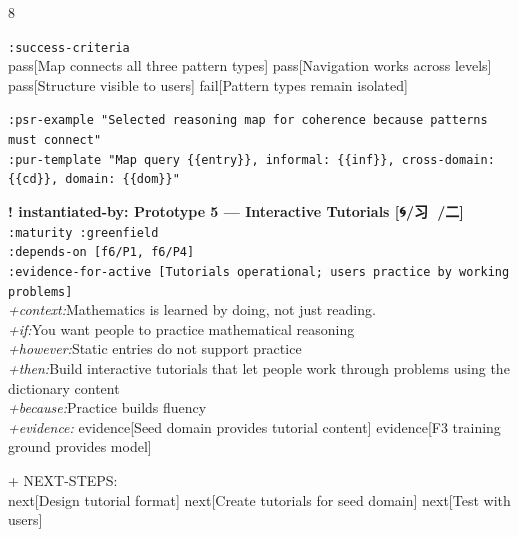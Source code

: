 \documentclass[landscape]{article}
\newcommand{\flexitag}[1]{\textcolor[gray]{0.35}{\textit{#1}}}
\newenvironment{devmapgreenfield}{%
  \def\FrameCommand{\colorbox{devmapgreenfieldbg}}%
  \setlength{\fboxsep}{2pt}%
  \MakeFramed{\advance\hsize-\width \FrameRestore}%
}{\endMakeFramed}
\begin{document}
\begin{paracol}{8}
\begin{devmapgreenfield}
\par
  \texttt{:\allowbreak{}success-\allowbreak{}criteria}\\
    pass[Map connects all three pattern types] pass[Navigation works across levels] pass[Structure visible to users] fail[Pattern types remain isolated]\\
\par
  \texttt{:\allowbreak{}psr-\allowbreak{}example "Selected reasoning map for coherence because patterns must connect"}\\
  \texttt{:\allowbreak{}pur-\allowbreak{}template "Map query \{\{entry\}\},\allowbreak{} informal:\allowbreak{} \{\{inf\}\},\allowbreak{} cross-\allowbreak{}domain:\allowbreak{} \{\{cd\}\},\allowbreak{} domain:\allowbreak{} \{\{dom\}\}"}\\
\par
\par
\end{devmapgreenfield}
\begin{devmapgreenfield}
\textbf{! instantiated-by: Prototype 5 — Interactive Tutorials [🌀/习 🐴/二]}\\
  \texttt{:\allowbreak{}maturity :\allowbreak{}greenfield}\\
  \texttt{:\allowbreak{}depends-\allowbreak{}on [f6/\allowbreak{}P1,\allowbreak{} f6/\allowbreak{}P4]}\\
  \texttt{:\allowbreak{}evidence-\allowbreak{}for-\allowbreak{}active [Tutorials operational;\allowbreak{} users practice by working problems]}\\
  \flexitag{+context:}Mathematics is learned by doing, not just reading.\\
  \flexitag{+if:}You want people to practice mathematical reasoning\\
  \flexitag{+however:}Static entries do not support practice\\
  \flexitag{+then:}Build interactive tutorials that let people work through problems using the dictionary content\\
  \flexitag{+because:}Practice builds fluency\\
  \flexitag{+evidence:} evidence[Seed domain provides tutorial content] evidence[F3 training ground provides model]\\
\par
  + NEXT-STEPS:\\
    next[Design tutorial format] next[Create tutorials for seed domain] next[Test with users]\\
\par

\end{devmapgreenfield}
\end{paracol}
\end{document}
